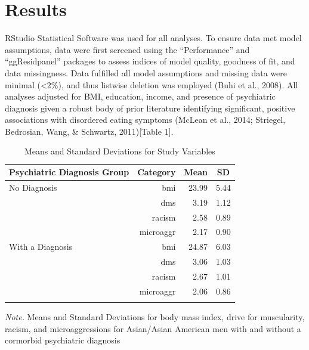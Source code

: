 \documentclass[
  english,
  man, fleqn, noextraspace,floatsintext]{apa6}
\begin{document}
\hypertarget{results}{%
\section{Results}\label{results}}

RStudio Statistical Software was used for all analyses. To ensure data met model assumptions, data were first screened using the ``Performance'' and ``ggResidpanel'' packages to assess indices of model quality, goodness of fit, and data missingness. Data fulfilled all model assumptions and missing data were minimal (\textless2\%), and thus listwise deletion was employed (Buhi et al., 2008). All analyses adjusted for BMI, education, income, and presence of psychiatric diagnosis given a robust body of prior literature identifying significant, positive associations with disordered eating symptoms (McLean et al., 2014; Striegel, Bedrosian, Wang, \& Schwartz, 2011){[}Table 1{]}.

\begin{table}[tbp]

\begin{center}
\begin{threeparttable}

\caption{\label{tab:table1}Means and Standard Deviations for Study Variables}

\begin{tabular}{lrrr}
\toprule
Psychiatric Diagnosis Group & \multicolumn{1}{c}{Category} & \multicolumn{1}{c}{Mean} & \multicolumn{1}{c}{SD}\\
\midrule
No Diagnosis & bmi & 23.99 & 5.44\\
 & dms & 3.19 & 1.12\\
 & racism & 2.58 & 0.89\\
 & microaggr & 2.17 & 0.90\\
With a Diagnosis & bmi & 24.87 & 6.03\\
 & dms & 3.06 & 1.03\\
 & racism & 2.67 & 1.01\\
 & microaggr & 2.06 & 0.86\\
\bottomrule
\addlinespace
\end{tabular}

\begin{tablenotes}[para]
\normalsize{\textit{Note.}  Means and Standard Deviations for body mass index, drive for muscularity, racism, and microaggressions for Asian/Asian American men with and without a cormorbid psychiatric diagnosis}
\end{tablenotes}

\end{threeparttable}
\end{center}

\end{table}
\end{document}
